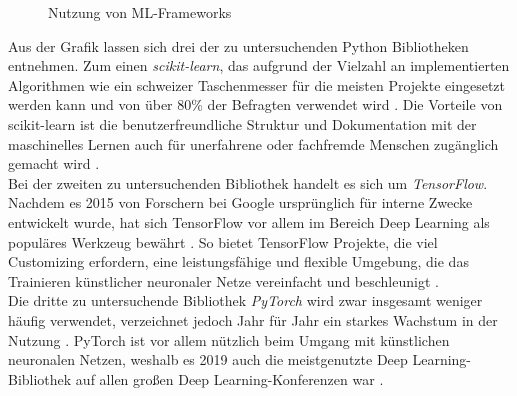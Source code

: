 \documentclass[german,bachelor]{swsLeipzig}
\begin{document}
\begin{figure}[H]
\begin{center}
\caption{Nutzung von ML-Frameworks \cite[]{kaggle}} \label{fig:kaggle}
\end{center}
\end{figure}

Aus der Grafik lassen sich drei der zu untersuchenden Python Bibliotheken entnehmen.
Zum einen \textit{scikit-learn}, das aufgrund der Vielzahl an implementierten Algorithmen wie ein \glqq schweizer Taschenmesser\grqq{}
für die meisten Projekte eingesetzt werden kann und von über 80\% der Befragten verwendet wird \cite[]{kaggle}.
Die Vorteile von scikit-learn ist die benutzerfreundliche Struktur und Dokumentation mit der maschinelles Lernen
auch für unerfahrene oder fachfremde Menschen zugänglich gemacht wird \cite[S.29]{10.1145/2786984.2786995}.\\

Bei der zweiten zu untersuchenden Bibliothek handelt es sich um \textit{TensorFlow}.
Nachdem es 2015 von Forschern bei Google ursprünglich für interne Zwecke entwickelt wurde, hat sich TensorFlow vor allem im Bereich
Deep Learning als populäres Werkzeug bewährt \cite[S. 227]{doi:10.3102/1076998619872761}.
So bietet TensorFlow Projekte, die viel Customizing erfordern, eine leistungsfähige und flexible Umgebung, die das Trainieren
künstlicher neuronaler Netze vereinfacht und beschleunigt \cite[S. 227]{doi:10.3102/1076998619872761}.\\

Die dritte zu untersuchende Bibliothek \textit{PyTorch} wird zwar insgesamt weniger häufig verwendet, verzeichnet
jedoch Jahr für Jahr ein starkes Wachstum in der Nutzung \cite[]{kaggle}.
PyTorch ist vor allem nützlich beim Umgang mit künstlichen neuronalen Netzen, weshalb es 2019 auch die
meistgenutzte Deep Learning-Bibliothek auf allen großen Deep Learning-Konferenzen war \cite[S. 23]{2020}.\\
\end{document}
